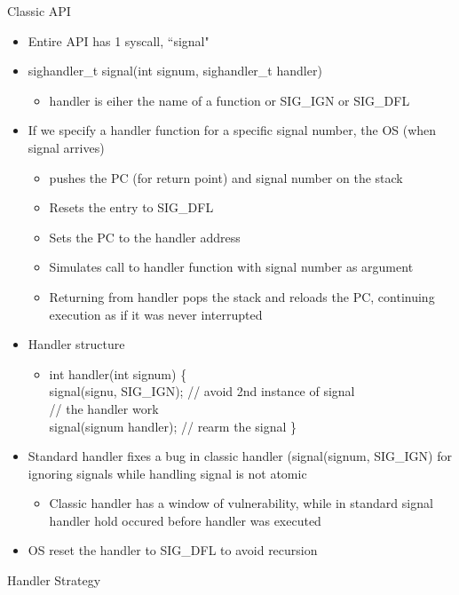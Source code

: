 Classic API
\begin{itemize}
    \item Entire API has 1 syscall, ``signal"
    \item sighandler\_t signal(int signum, sighandler\_t handler)
    \begin{itemize}
        \item handler is eiher the name of a function or SIG\_IGN or SIG\_DFL
    \end{itemize}
    \item If we specify a handler function for a specific signal number, the OS (when signal arrives)
    \begin{itemize}
        \item pushes the PC (for return point) and signal number on the stack
        \item Resets the entry to SIG\_DFL
        \item Sets the PC to the handler address
        \item Simulates call to handler function with signal number as argument
        \item Returning from handler pops the stack and reloads the PC, continuing execution as if it was never interrupted
    \end{itemize}
    \item Handler structure
    \begin{itemize}
        \item int handler(int signum) \{\\
        signal(signu, SIG\_IGN); // avoid 2nd instance of signal\\
        // the handler work\\
        signal(signum handler); // rearm the signal \}
    \end{itemize}
    \item Standard handler fixes a bug in classic handler (signal(signum, SIG\_IGN) for ignoring signals while handling signal is not atomic
    \begin{itemize}
        \item Classic handler has a window of vulnerability, while in standard signal handler hold occured before handler was executed
    \end{itemize}
    \item OS reset the handler to SIG\_DFL to avoid recursion
\end{itemize}
Handler Strategy
